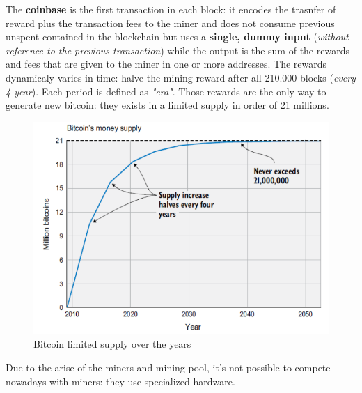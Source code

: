 \documentclass[10pt,a4paper]{report}
\begin{document}
The \textbf{coinbase} is the first transaction in each block: it encodes the trasnfer of reward plus the transaction fees to the miner and does not consume previous unspent contained in the blockchain but uses a \textbf{single, dummy input} (\textit{without reference to the previous transaction}) while the output is the sum of the rewards and fees that are given to the miner in one or more addresses.
The rewards dynamicaly varies in time: halve the mining reward after all 210.000 blocks (\textit{every 4 year}). Each period is defined as \textit{"era"}.
Those rewards are the only way to generate new bitcoin: they exists in a limited supply in order of 21 millions.
\begin{figure}
	\centering
	\includegraphics[scale=0.50]{images/Pasted image 20230331154548.png}
	\caption{Bitcoin limited supply over the years}\end{figure}


Due to the arise of the miners and mining pool, it's not possible to compete nowadays with miners: they use specialized hardware.
\end{document}
